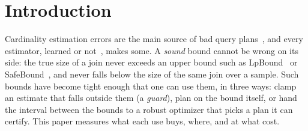 \documentclass[sigconf, nonacm]{acmart}
\begin{document}
\maketitle

\vldbtopmatter


\section{Introduction}
\label{sec:intro}
Cardinality estimation errors are the main source of bad query
plans~\cite{leis2015good}, and every estimator, learned or
not~\cite{han2021cardest}, makes some. A \emph{sound} bound cannot be wrong on
its side: the true size of a join never exceeds an upper bound such as
LpBound~\cite{zhang2025lpbound} or SafeBound~\cite{deeds2023safebound}, and
never falls below the size of the same join over a sample. Such bounds have
become tight enough that one can use them, in three ways:
clamp an estimate that falls outside them (a \emph{guard}), plan on the bound
itself, or hand the interval between the bounds to a robust optimizer that
picks a plan it can certify. This paper measures what each use buys, where,
and at what cost.
\end{document}
